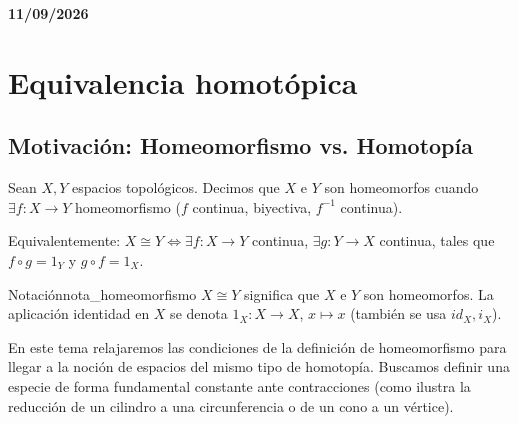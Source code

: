 \textbf{11/09/2026}
\section{Equivalencia homotópica}

\subsection{Motivación: Homeomorfismo vs. Homotopía}

Sean $X, Y$ espacios topológicos. Decimos que $X$ e $Y$ son homeomorfos cuando $\exists f \colon X \to Y$ homeomorfismo ($f$ continua, biyectiva, $f^{-1}$ continua).

Equivalentemente: $X \cong Y \iff \exists f \colon X \to Y$ continua, $\exists g \colon Y \to X$ continua, tales que $f \circ g = 1_Y$ y $g \circ f = 1_X$.

\begin{nota}{Notación}{nota_homeomorfismo}
$X \cong Y$ significa que $X$ e $Y$ son homeomorfos. La aplicación identidad en $X$ se denota $1_X \colon X \to X$, $x \mapsto x$ (también se usa $id_X, i_X$).
\end{nota}

En este tema relajaremos las condiciones de la definición de homeomorfismo para llegar a la noción de espacios del mismo tipo de homotopía. Buscamos definir una especie de forma fundamental constante ante contracciones (como ilustra la reducción de un cilindro a una circunferencia o de un cono a un vértice).

\begin{center}
\end{center}

